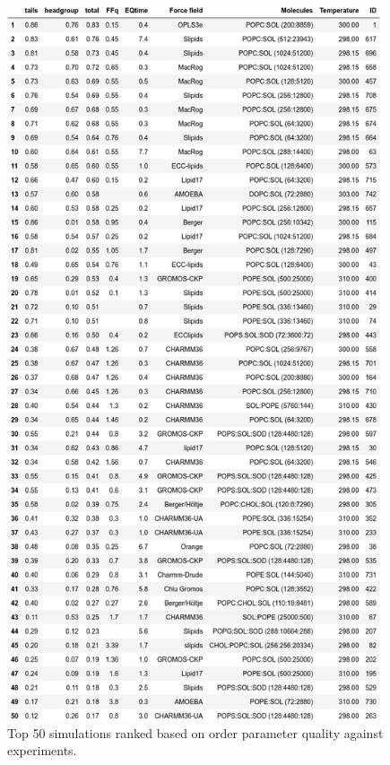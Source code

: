 \documentclass[fleqn,10pt]{wlscirep}
\begin{document}
\begin{figure}
    \centering
    \includegraphics[width = 110mm]{Figures/scripts/TotalRanking.png}
    \caption{Top 50 simulations ranked based on order parameter quality against experiments.}
    \label{fig:top50simulations}
\end{figure}
\end{document}
